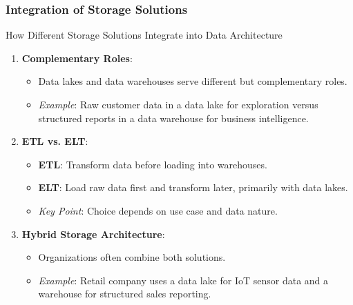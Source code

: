 \documentclass[aspectratio=169]{beamer}
\begin{document}
\begin{frame}[fragile]
    \frametitle{Integration of Storage Solutions}
    \begin{block}{How Different Storage Solutions Integrate into Data Architecture}
        \begin{enumerate}
            \item \textbf{Complementary Roles}:
                \begin{itemize}
                    \item Data lakes and data warehouses serve different but complementary roles. 
                    \item \textit{Example}: Raw customer data in a data lake for exploration versus structured reports in a data warehouse for business intelligence.
                \end{itemize}
            \item \textbf{ETL vs. ELT}:
                \begin{itemize}
                    \item \textbf{ETL}: Transform data before loading into warehouses.
                    \item \textbf{ELT}: Load raw data first and transform later, primarily with data lakes.
                    \item \textit{Key Point}: Choice depends on use case and data nature.
                \end{itemize}
            \item \textbf{Hybrid Storage Architecture}:
                \begin{itemize}
                    \item Organizations often combine both solutions. 
                    \item \textit{Example}: Retail company uses a data lake for IoT sensor data and a warehouse for structured sales reporting.
                \end{itemize}
        \end{enumerate}
    \end{block}
\end{frame}
\end{document}
